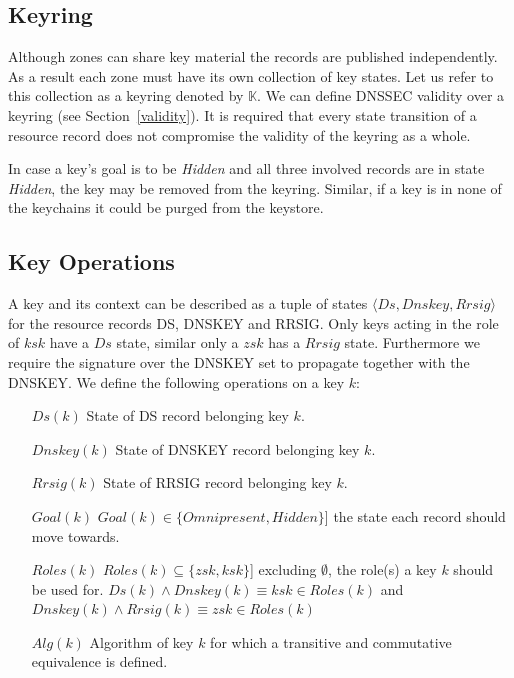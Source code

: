 \documentclass[twoside,english, a4paper]{article}
\begin{document}
\subsection{Keyring}

Although zones can share key material the records are published 
independently. As a result each zone must have its own collection of
key states. Let us refer to this collection as a keyring denoted 
by $\mathbb{K}$. We can
define DNSSEC validity over a keyring (see Section~\ref{validity}).
It is required that every state transition of a resource record does 
not compromise the validity of the keyring as a whole.

In case a key's goal is to be \emph{Hidden} and all three involved
records are in state \emph{Hidden}, the key may be removed from the
keyring. Similar, if a key is in none of the keychains it could be
purged from the keystore.

\subsection{Key Operations}

A key and its context can be described as a tuple of states $\langle 
Ds,Dnskey,Rrsig\rangle$ for the resource records DS, DNSKEY and RRSIG.
Only keys acting in the role of $ksk$ have a $Ds$ state, similar
only a $zsk$ has a $Rrsig$ state. Furthermore we require the signature
over the DNSKEY set to propagate together with the DNSKEY.
We define the following operations on a key $k$:

\begin{itemize}
	\item[$Ds(k)$] State of DS record belonging key $k$.
	\item[$Dnskey(k)$] State of DNSKEY record belonging key $k$.
	\item[$Rrsig(k)$] State of RRSIG record belonging key $k$.
	\item[$Goal(k)$] $Goal(k) \in \{Omnipresent, Hidden\}$] the state each record
		should move towards.
	\item[$Roles(k)$] $Roles(k) \subseteq \{zsk,ksk\}$] excluding $\emptyset$, the 
		role(s) a key $k$ should be used for.
		$Ds(k) \wedge Dnskey(k) \equiv ksk \in Roles(k)$ and
		$Dnskey(k) \wedge Rrsig(k) \equiv zsk \in Roles(k)$
	\item[$Alg(k)$] Algorithm of key $k$ for which a transitive and 
		commutative equivalence is defined.
\end{itemize}
\end{document}
